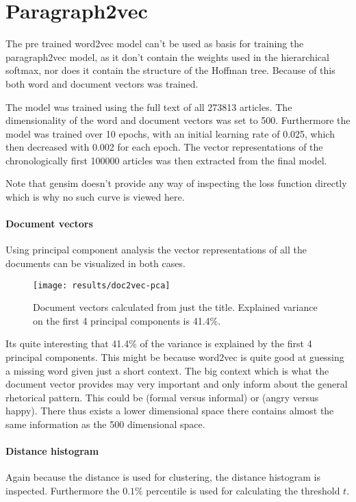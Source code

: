 \section{Paragraph2vec}

The pre trained word2vec model can't be used as basis for training the paragraph2vec model, as it don't contain the weights used in the hierarchical softmax, nor does it contain the structure of the Hoffman tree. Because of this both word and document vectors was trained.

The model was trained using the full text of all 273813 articles. The dimensionality of the word and document vectors was set to 500. Furthermore the model was trained over 10 epochs, with an initial learning rate of 0.025, which then decreased with 0.002 for each epoch. The vector representations of the chronologically first 100000 articles was then extracted from the final model.

Note that gensim doesn't provide any way of inspecting the loss function directly which is why no such curve is viewed here.  

\paragraph{Document vectors} Using principal component analysis the vector representations of all the documents can be visualized in both cases.

\begin{figure}[H]
	\centering
	\texttt{[image: results/doc2vec-pca]}
	\caption{Document vectors calculated from just the title. Explained variance on the first 4 principal components is 41.4\%.}
\end{figure}

Its quite interesting that 41.4\% of the variance is explained by the first 4 principal components. This might be because word2vec is quite good at guessing a missing word given just a short context. The big context which is what the document vector provides may very important and only inform about the general rhetorical pattern. This could be (formal versus  informal) or (angry versus happy). There thus exists a lower dimensional space there contains almost the same information as the 500 dimensional space.

\paragraph{Distance histogram} Again because the distance is used for clustering, the distance histogram is inspected. Furthermore the $0.1\%$ percentile is used for calculating the threshold $t$.

